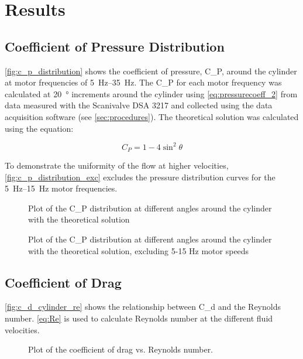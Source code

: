 \chapter{Results}
\label{cp:results}

\section{Coefficient of Pressure Distribution} \label{sec c_p_distribution}

\autoref{fig:c_p_distribution} shows the coefficient of pressure, \gls{C_P}, around the cylinder at motor frequencies of \qtyrange{5}{35}{\hertz}. The \gls{C_P} for each motor frequency was calculated at \qty{20}{\degree} increments around the cylinder using \autoref{eq:pressurecoeff_2} from data measured with the Scanivalve DSA 3217 and collected using the data acquisition software (see \autoref{sec:procedures}). The theoretical solution was calculated using the equation:

\begin{equation}\label{eq:theoretical_sol}
    C_P = 1 - 4\sin^2{\theta}
\end{equation}

To demonstrate the uniformity of the flow at higher velocities, \autoref{fig:c_p_distribution_exc} excludes the pressure distribution curves for the \qtyrange{5}{15}{\hertz} motor frequencies.

\begin{figure}[htpb]
    \centering
    
    \caption[Plot of the coefficient of pressure distribution around a cylinder]{Plot of the \gls{C_P} distribution at different angles around the cylinder with the theoretical solution}
    \label{fig:c_p_distribution}
\end{figure}

\begin{figure}[htpb]
    \centering
    
    \caption[Plot of the coefficient of pressure distribution around a cylinder]{Plot of the \gls{C_P} distribution at different angles around the cylinder with the theoretical solution, excluding 5-15 Hz motor speeds}
    \label{fig:c_p_distribution_exc}
\end{figure}

\newpage

\section{Coefficient of Drag} \label{sec c_d}

\autoref{fig:c_d_cylinder_re} shows the relationship between \gls{C_d} and the Reynolds number. \autoref{eq:Re} is used to calculate Reynolds number at the different fluid velocities.

\begin{figure}[htpb]
    \centering
    
    \caption[Plot of coefficient of drag vs. Reynolds number]{Plot of the coefficient of drag vs. Reynolds number.}
    \label{fig:c_d_cylinder_re}
\end{figure}